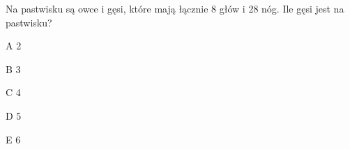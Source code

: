 \begin{tresc}
Na pastwisku są owce i gęsi, które mają łącznie 8 głów i 28 nóg. Ile gęsi jest na pastwisku?
\end{tresc}
\begin{wariant}{A} 2 \end{wariant}
\begin{wariant}{B} 3 \end{wariant}
\begin{wariant}{C} 4 \end{wariant}
\begin{wariant}{D} 5 \end{wariant}
\begin{wariant}{E} 6 \end{wariant}
